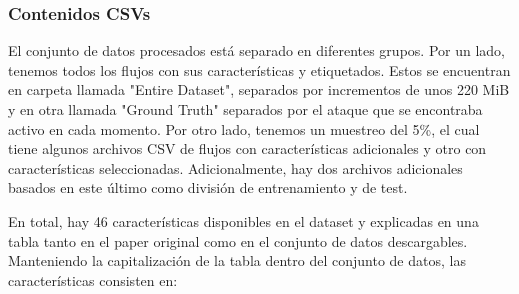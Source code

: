 \subsubsection{Contenidos CSVs}

El conjunto de datos procesados está separado en diferentes grupos. Por un lado, tenemos todos los flujos con sus características y etiquetados. Estos se encuentran en carpeta llamada "Entire Dataset", separados por incrementos de unos 220 MiB y en otra llamada "Ground Truth" separados por  el ataque que se encontraba activo en cada momento. Por otro lado, tenemos un muestreo del 5\%, el cual tiene algunos archivos CSV de flujos con características adicionales y otro con características seleccionadas. Adicionalmente, hay dos archivos adicionales basados en este último como división de entrenamiento y de test.

En total, hay 46 características disponibles en el dataset y explicadas en una tabla tanto en el paper original como en el conjunto de datos descargables. Manteniendo la capitalización de la tabla dentro del conjunto de datos, las características consisten en:

